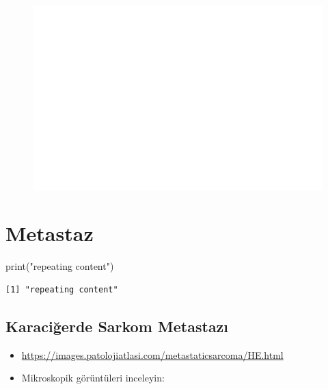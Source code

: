 \documentclass[
  letterpaper,
  DIV=11,
  numbers=noendperiod]{scrreprt}
\newenvironment{Shaded}{}{}
\newcommand{\FunctionTok}[1]{\textcolor[rgb]{0.02,0.16,0.49}{#1}}
\newcommand{\NormalTok}[1]{#1}
\newcommand{\StringTok}[1]{\textcolor[rgb]{0.25,0.44,0.63}{#1}}
\begin{document}
\begin{figure}[H]

{\centering 

\href{https://images.patolojiatlasi.com/ectopic-adrenal/HE.html}{\includegraphics{./heterotopi_files/figure-pdf/unnamed-chunk-5-1.pdf}}

}

\end{figure}

\hypertarget{metastaz}{%
\chapter{Metastaz}\label{metastaz}}

\begin{Shaded}
\begin{Highlighting}[]
\FunctionTok{print}\NormalTok{(}\StringTok{"repeating content"}\NormalTok{)}
\end{Highlighting}
\end{Shaded}

\begin{verbatim}
[1] "repeating content"
\end{verbatim}

\hypertarget{karaciux11ferde-sarkom-metastazux131}{%
\section{Karaciğerde Sarkom
Metastazı}\label{karaciux11ferde-sarkom-metastazux131}}

\begin{itemize}
\item
  \url{https://images.patolojiatlasi.com/metastaticsarcoma/HE.html}
\item
  Mikroskopik görüntüleri inceleyin:
\end{itemize}
\end{document}
